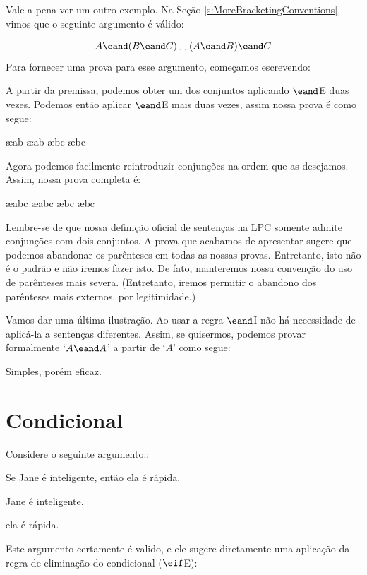 Vale a pena ver um outro exemplo.  Na Seção   \ref{s:MoreBracketingConventions}, vimos  que o seguinte  argumento é válido:

	$$A \eand (B \eand C) \therefore (A \eand B) \eand C$$
 Para fornecer uma prova para esse argumento,  começamos escrevendo: 
\begin{fitchproof}
\end{fitchproof}
 A partir da premissa, podemos obter um dos conjuntos aplicando $\eand$E duas vezes. Podemos então aplicar $\eand$E mais duas vezes,  assim nossa prova é como segue: 
\begin{fitchproof}
	 \ae{ab}
	 \ae{ab}
	 \ae{bc}
	 \ae{bc}
\end{fitchproof}
 Agora podemos facilmente reintroduzir conjunções na ordem que as desejamos. Assim, nossa prova  completa é:
 
\begin{fitchproof}
	 \ae{abc}
	 \ae{abc}
	 \ae{bc}
	 \ae{bc}
\end{fitchproof}
Lembre-se de que nossa definição oficial de sentenças na LPC somente admite conjunções com dois conjuntos.  A prova que acabamos de apresentar sugere que podemos abandonar  os parênteses em todas as nossas provas. Entretanto, isto não é o padrão e  não iremos fazer isto.  De fato, manteremos nossa convenção do uso de parênteses mais severa. (Entretanto, iremos permitir o abandono dos parênteses mais externos, por legitimidade.)  

Vamos dar uma última ilustração. Ao usar a regra $\eand$I 
não há necessidade de aplicá-la a sentenças diferentes.
Assim, se quisermos, podemos provar formalmente  `$A \eand A$' a partir de `$A$' como  segue:
\begin{fitchproof}
\end{fitchproof}
Simples, porém eficaz.

\section{Condicional}
Considere o seguinte argumento::
\begin{earg}
		\item[] Se Jane é inteligente, então ela é rápida.
		\item[] Jane é inteligente.
		\item[\therefore] ela é rápida.
\end{earg}
Este argumento certamente é valido, e ele sugere diretamente uma aplicação da  regra de eliminação do condicional  ($\eif$E):
 
